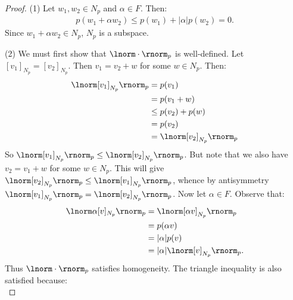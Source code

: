 \documentclass[11pt,twoside,openany]{memoir}
\begin{document}
        \begin{proof}
            (1) Let $w_1,w_2 \in N_p$ and $\alpha \in F$. Then:
                \begin{equation*}
                \begin{split}
                    p(w_1 + \alpha w_2) \leq p(w_1) + |\alpha|p(w_2) = 0.
                \end{split}
                \end{equation*}
                Since $w_1 + \alpha w_2 \in N_p$, $N_p$ is a subspace.

            (2) We must first show that $\lnorm \cdot \rnorm_p$ is well-defined. Let $[v_1]_{N_p} = [v_2]_{N_p}$. Then $v_1 = v_2 + w$ for some $w \in N_p$. Then:
                \begin{equation*}
                \begin{split}
                    \lnorm [v_1]_{N_p} \rnorm_p 
                    & = p(v_1) \\
                    & = p(v_1 + w) \\
                    & \leq p(v_2) + p(w) \\
                    & = p(v_2) \\
                    & = \lnorm [v_2]_{N_p} \rnorm_p
                \end{split}
                \end{equation*}
            So $\lnorm [v_1]_{N_p} \rnorm_p \leq \lnorm [v_2]_{N_p} \rnorm_p$. But note that we also have $v_2 = v_1 + w$ for some $w \in N_p$. This will give $\lnorm [v_2]_{N_p} \rnorm_p \leq \lnorm [v_1]_{N_p} \rnorm_p$, whence by antisymmetry $\lnorm [v_1]_{N_p} \rnorm_p = \lnorm [v_2]_{N_p} \rnorm_p$. Now let $\alpha \in F$. Observe that:
                \begin{equation*}
                \begin{split}
                    \lnorm \alpha [v]_{N_p} \rnorm_p 
                    & = \lnorm [\alpha v]_{N_p} \rnorm_p  \\
                    & = p(\alpha v) \\
                    & = |\alpha| p(v) \\
                    & = |\alpha|\lnorm [v]_{N_p} \rnorm_p.
                \end{split}
                \end{equation*}
            Thus $\lnorm \cdot \rnorm_p$ satisfies homogeneity. The triangle inequality is also satisfied because:
                \begin{equation*}

\end{equation*}
\end{proof}
\end{document}
